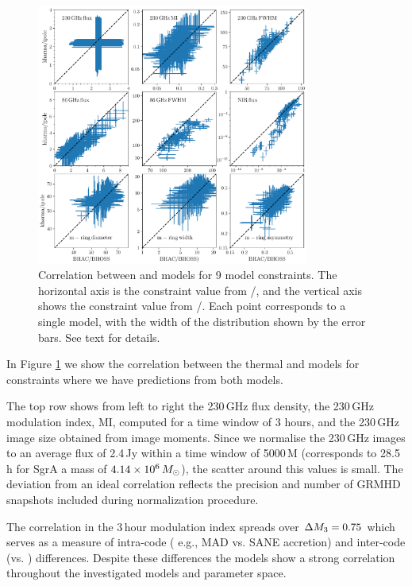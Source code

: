 \begin{figure}
  \centering
  \includegraphics[width=0.8\textwidth]{./figures/BHAC_iharm_correlation2}
  \caption{Correlation between \bhac and \kharma models for 9 model constraints.  The horizontal axis is the constraint value from \bhac/\bhoss, and the vertical axis shows the constraint value from \kharma/\ipole.  Each point corresponds to a single model, with the width of the distribution shown by the error bars.  See text for details.}
  \label{fig:modelcorrelation}
\end{figure}

In Figure \ref{fig:modelcorrelation} we show the correlation between the thermal \kharma and \bhac models for constraints where we have predictions from both models.

The top row shows from left to right the 230\,GHz flux density, the 230\,GHz modulation index, MI, computed for a time window of 3 hours, and the 230\,GHz image size obtained from image moments. Since we normalise the 230\,GHz images to an average flux of 2.4\,Jy within a time window of 5000\,M (corresponds to 28.5 h for SgrA a mass of $4.14\times 10^6\,M_\odot$), the scatter around this values is small. The deviation from an ideal correlation reflects the precision and number of GRMHD snapshots included during normalization procedure.

The correlation in the 3\,hour modulation index spreads over $\Delta M_{3}=0.75$ which serves as a measure of intra-code ( e.g., MAD vs. SANE accretion) and inter-code (\bhac vs. \kharma) differences. Despite these differences the models show a strong correlation throughout the investigated models and parameter space.

